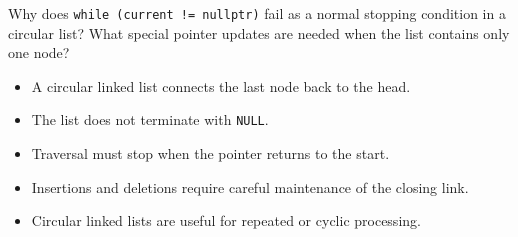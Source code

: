 \begin{quickcheck}
Why does \texttt{while (current != nullptr)} fail as a normal stopping condition in a circular list? What special pointer updates are needed when the list contains only one node?
\end{quickcheck}

\begin{chapterrecap}
\begin{itemize}
  \item A circular linked list connects the last node back to the head.
  \item The list does not terminate with \texttt{NULL}.
  \item Traversal must stop when the pointer returns to the start.
  \item Insertions and deletions require careful maintenance of the closing link.
  \item Circular linked lists are useful for repeated or cyclic processing.
\end{itemize}
\end{chapterrecap}


